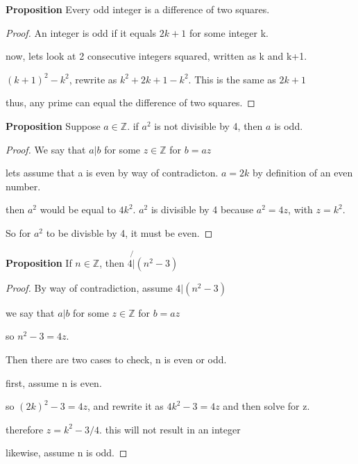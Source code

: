 \documentclass[12pt]{article}
\def\Z{\mathbb Z}
\begin{document}
{\bf Proposition} Every odd integer is a difference of two squares.
\begin{proof}
    An integer is odd if it equals $2k+1$ for some integer k.

    now, lets look at 2 consecutive integers squared, written as k and k+1.

    $(k+1)^2 - k^2$, rewrite as $k^2+2k+1-k^2$. This is the same as $2k+1$

    thus, any prime can equal the difference of two squares.

\end{proof}

{\bf Proposition} Suppose $a\in \Z$. if $a^2$ is not divisible by 4, then $a$ is odd.
\begin{proof}

    We say that $a|b$ for some $z\in\Z$ for $b=az$

    lets assume that a is even by way of contradicton. $a=2k$ by definition of an even number.

    then $a^2$ would be equal to $4k^2$. $a^2$ is divisible by 4 because $a^2=4z$, with $z=k^2$.

    So for $a^2$ to be divisble by 4, it must be even.

\end{proof}

{\bf Proposition} If $n\in\Z$, then $4\not{|} (n^2-3)$
\begin{proof}
    By way of contradiction, assume $4|(n^2-3)$
    
    we say that $a|b$ for some $z\in\Z$ for $b=az$

    so $n^2-3=4z$.

    Then there are two cases to check, n is even or odd.

    first, assume n is even.

    so $(2k)^2-3=4z$, and rewrite it as $4k^2-3=4z$ and then solve for z.

    therefore $z=k^2-3/4$. this will not result in an integer

    likewise, assume n is odd.
\end{proof}
\end{document}
